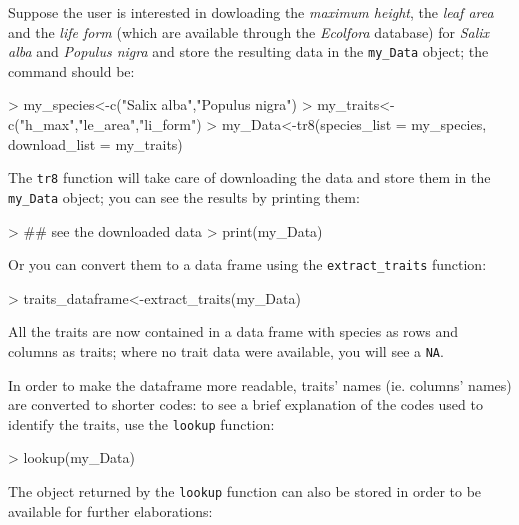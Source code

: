 \documentclass{article}
\begin{document}
 Suppose the user is interested in dowloading the \textit{maximum
   height}, the \textit{leaf area} and the \textit{life form} (which
 are available through the \textit{Ecolfora} database) for
 \textit{Salix alba} and \textit{Populus nigra} and store the resulting data in the \texttt{my\_Data} object; the command should be:
 
\begin{Schunk}
\begin{Sinput}
> my_species<-c("Salix alba","Populus nigra")
> my_traits<-c("h_max","le_area","li_form")
> my_Data<-tr8(species_list = my_species, download_list = my_traits)
\end{Sinput}
\end{Schunk}

  The \texttt{tr8} function will take care of downloading the data and
  store them in the \texttt{my\_Data} object; you can see the results
  by printing them:

\begin{Schunk}
\begin{Sinput}
> ## see the downloaded data
> print(my_Data)
\end{Sinput}
\end{Schunk}

  Or you can convert them to a data frame using the \texttt{extract\_traits} function:
  
\begin{Schunk}
\begin{Sinput}
> traits_dataframe<-extract_traits(my_Data)
\end{Sinput}
\end{Schunk}

  All the traits are now contained in a data frame with species as rows
  and columns as traits; where no trait data were available, you will
  see a \texttt{NA}. 

  
  In order to make the dataframe more readable,  traits' names (ie. columns' names) are converted to shorter codes: to see a brief explanation of the codes used to identify the traits, use the \texttt{lookup} function: 


\begin{Schunk}
\begin{Sinput}
> lookup(my_Data)
\end{Sinput}
\end{Schunk}

   The object returned by the \texttt{lookup} function can also be stored in order to be available for further elaborations:
   
\end{document}
